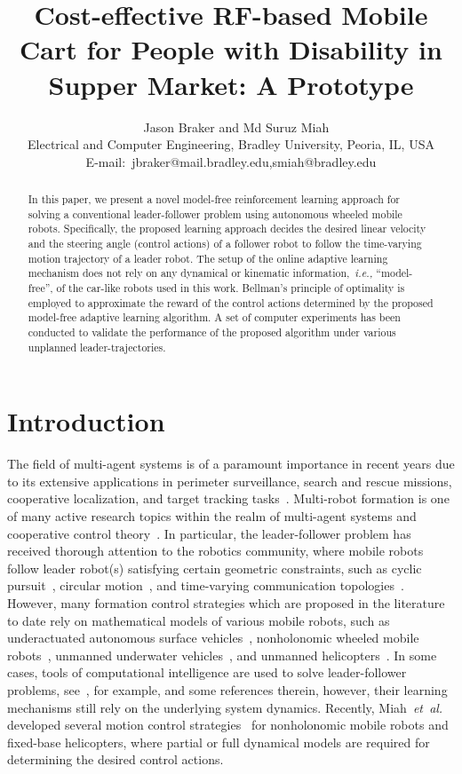 \documentclass[letterpaper]{article} %
\title{Cost-effective RF-based Mobile Cart for People with Disability in Supper
  Market: A Prototype}
\author{~%
  Jason Braker and Md Suruz Miah
  \\
  Electrical and Computer Engineering, Bradley University, Peoria, IL, USA\\
  E-mail:~jbraker@mail.bradley.edu,smiah@bradley.edu }
\begin{document}
\maketitle

\begin{abstract}
In this paper, we present a novel model-free reinforcement learning approach for solving a conventional leader-follower problem using autonomous wheeled mobile robots. Specifically, the proposed learning approach decides the desired linear velocity and the steering angle (control actions) of a follower robot to follow the time-varying motion trajectory of
a leader robot. The setup of the online adaptive learning mechanism does not rely on any dynamical or kinematic information,~\textit{i.e.,} ``model-free'', of the car-like robots used in this work. Bellman's principle of optimality is employed to approximate the reward of the control actions determined by the proposed model-free adaptive learning algorithm. A set of computer experiments has been conducted to validate the performance of the proposed algorithm under various unplanned leader-trajectories.
\end{abstract}

\section{Introduction}
\label{sec:introduction}
The field of multi-agent systems %
is of a paramount importance in recent years due to its extensive applications in perimeter surveillance, search and rescue missions, cooperative localization, and target tracking tasks~\cite{Ma2019-Cooperative,Kia2018-ServerAssisted,Khan2018-Cooperative}. Multi-robot formation is one of many  active research topics within the realm of multi-agent systems and cooperative control theory~\cite{Oh2015-Survey}. In particular, the leader-follower problem has received thorough attention to the robotics community, where mobile robots follow leader robot(s) satisfying certain geometric constraints, such as cyclic pursuit~\cite{Yu2019-Cooperative,Marshall2004}, circular motion~\cite{Ma2019-Cooperative}, and time-varying communication topologies~\cite{Sakai208-Leader,Li2019-TimeVarying}. However,  many formation control strategies which are proposed in the literature to date rely on mathematical models of various mobile robots, such as underactuated autonomous surface vehicles~\cite{Liu2017-Modular}, nonholonomic wheeled mobile robots~\cite{Miao2018-Distributed}, unmanned underwater vehicles~\cite{Liu2019-Robust,Bechlioulis2019-Robust}, and unmanned helicopters~\cite{Kuo2019-Intelligent}.  In some cases, tools of computational intelligence are used to solve leader-follower problems, see~\cite{Xiao2019-LeaderFollower,Kuo2019-Intelligent}, for example, and some references therein, however, their learning mechanisms still rely on the underlying system dynamics. Recently, Miah~\textit{et~al.} developed several motion control strategies~\cite{MiKaCh2019-j1,MiKn2018-j1,MiFaChGu2017-j1,MiGu2015-j1,MiGu2014-j1} for nonholonomic mobile robots and fixed-base helicopters, where partial or full dynamical models are required for determining the desired control actions. 
\end{document}
